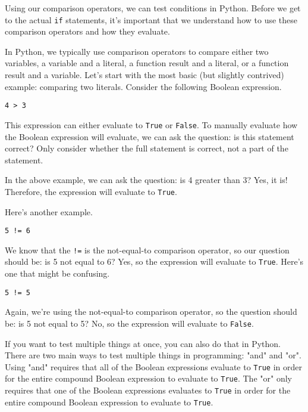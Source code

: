 Using our comparison operators, we can test conditions in Python. Before we get to the actual \verb|if| statements, it's important that we understand how to use these comparison operators and how they evaluate.\par
In Python, we typically use comparison operators to compare either two variables, a variable and a literal, a function result and a literal, or a function result and a variable. Let's start with the most basic (but slightly contrived) example: comparing two literals. Consider the following Boolean expression.\par
\begin{lstlisting}[style=pippython]
4 > 3
\end{lstlisting}
This expression can either evaluate to \verb|True| or \verb|False|. To manually evaluate how the Boolean expression will evaluate, we can ask the question: is this statement correct? Only consider whether the full statement is correct, not a part of the statement.\par
In the above example, we can ask the question: is 4 greater than 3? Yes, it is! Therefore, the expression will evaluate to \verb|True|.\par
Here's another example.
\begin{lstlisting}[style=pippython]
5 != 6
\end{lstlisting}
We know that the \verb|!=| is the not-equal-to comparison operator, so our question should be: is 5 not equal to 6? Yes, so the expression will evaluate to \verb|True|. Here's one that might be confusing.\par
\begin{lstlisting}[style=pippython]
5 != 5
\end{lstlisting}
Again, we're using the not-equal-to comparison operator, so the question should be: is 5 not equal to 5? No, so the expression will evaluate to \verb|False|.\par
If you want to test multiple things at once, you can also do that in Python. There are two main ways to test multiple things in programming: "and" and "or". Using "and" requires that all of the Boolean expressions evaluate to \verb|True| in order for the entire compound Boolean expression to evaluate to \verb|True|. The "or" only requires that one of the Boolean expressions evaluates to \verb|True| in order for the entire compound Boolean expression to evaluate to \verb|True|.\par
